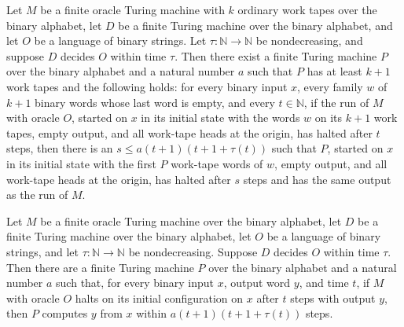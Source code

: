 \begin{theorem}
\label{Turing.FinOracleTM.exists_plain_simulation_of_monotone}
\leanok
{}
Let $M$ be a finite oracle Turing machine with $k$ ordinary work tapes over the binary
alphabet, let $D$ be a finite Turing machine over the binary alphabet, and let $O$ be a
language of binary strings. Let $\tau:\mathbb{N}\to\mathbb{N}$ be nondecreasing, and
suppose $D$ decides $O$ within time $\tau$. Then there exist a finite Turing machine $P$
over the binary alphabet and a natural number $a$ such that $P$ has at least $k+1$ work
tapes and the following holds: for every binary input $x$, every family $w$ of $k+1$
binary words whose last word is empty, and every $t\in\mathbb{N}$, if the run of $M$
with oracle $O$, started on $x$ in its initial state with the words $w$ on its $k+1$
work tapes, empty output, and all work-tape heads at the origin, has halted after $t$
steps, then there is an $s\le a(t+1)(t+1+\tau(t))$ such that $P$, started on $x$ in its
initial state with the first $P$ work-tape words of $w$, empty output, and all work-tape
heads at the origin, has halted after $s$ steps and has the same output as the run of
$M$.
\end{theorem}

\begin{theorem}
\label{Turing.FinOracleTM.exists_plain_simulation_initCfg}
\leanok
{}
Let $M$ be a finite oracle Turing machine over the binary alphabet, let $D$ be a finite
Turing machine over the binary alphabet, let $O$ be a language of binary strings, and
let $\tau:\mathbb{N}\to\mathbb{N}$ be nondecreasing. Suppose $D$ decides $O$ within time
$\tau$. Then there are a finite Turing machine $P$ over the binary alphabet and a
natural number $a$ such that, for every binary input $x$, output word $y$, and time $t$,
if $M$ with oracle $O$ halts on its initial configuration on $x$ after $t$ steps with
output $y$, then $P$ computes $y$ from $x$ within $a(t+1)(t+1+\tau(t))$ steps.
\end{theorem}

